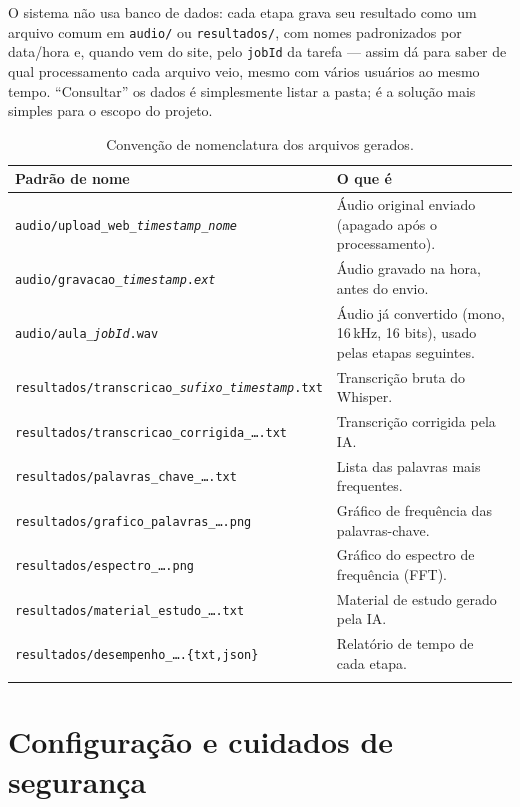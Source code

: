 \documentclass[11pt,a4paper]{article}
\newcommand{\pb}{\discretionary{}{}{}}
\begin{document}
O sistema não usa banco de dados: cada etapa grava seu resultado como um arquivo comum em \texttt{audio/} ou \texttt{resultados/}, com nomes padronizados por data/hora e, quando vem do site, pelo \texttt{jobId} da tarefa --- assim dá para saber de qual processamento cada arquivo veio, mesmo com vários usuários ao mesmo tempo. ``Consultar'' os dados é simplesmente listar a pasta; é a solução mais simples para o escopo do projeto.

\begin{longtable}{@{}p{6.6cm}p{7.6cm}@{}}
\toprule
\textbf{Padrão de nome} & \textbf{O que é} \\
\midrule
\endhead
{\small\texttt{audio/\pb upload\_\pb web\_\pb \emph{timestamp}\_\pb \emph{nome}}} & Áudio original enviado (apagado após o processamento). \\
{\small\texttt{audio/\pb gravacao\_\pb \emph{timestamp}.\emph{ext}}} & Áudio gravado na hora, antes do envio. \\
{\small\texttt{audio/\pb aula\_\pb \emph{jobId}.wav}} & Áudio já convertido (mono, 16\,kHz, 16 bits), usado pelas etapas seguintes. \\
{\small\texttt{resultados/\pb transcricao\_\pb \emph{sufixo}\_\pb \emph{timestamp}.txt}} & Transcrição bruta do Whisper. \\
{\small\texttt{resultados/\pb transcricao\_\pb corrigida\_\pb \ldots.txt}} & Transcrição corrigida pela IA. \\
{\small\texttt{resultados/\pb palavras\_\pb chave\_\pb \ldots.txt}} & Lista das palavras mais frequentes. \\
{\small\texttt{resultados/\pb grafico\_\pb palavras\_\pb \ldots.png}} & Gráfico de frequência das palavras-chave. \\
{\small\texttt{resultados/\pb espectro\_\pb \ldots.png}} & Gráfico do espectro de frequência (FFT). \\
{\small\texttt{resultados/\pb material\_\pb estudo\_\pb \ldots.txt}} & Material de estudo gerado pela IA. \\
{\small\texttt{resultados/\pb desempenho\_\pb \ldots.\{txt,json\}}} & Relatório de tempo de cada etapa. \\
\bottomrule
\caption{Convenção de nomenclatura dos arquivos gerados.}
\label{tab:nomenclatura}
\end{longtable}

\section{Configuração e cuidados de segurança}
\end{document}
